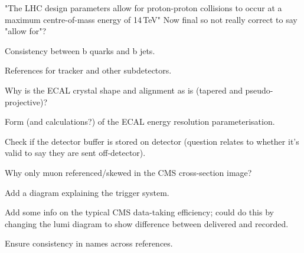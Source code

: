 
"The LHC design parameters allow for proton-proton collisions to occur at a maximum centre-of-mass energy of 14\,TeV"
Now final so not really correct to say "allow for"?

Consistency between b quarks and b jets.

References for tracker and other subdetectors.

Why is the ECAL crystal shape and alignment as is (tapered and pseudo-projective)?

Form (and calculations?) of the ECAL energy resolution parameterisation.

Check if the detector buffer is stored on detector (question relates to whether it's valid to say they are sent off-detector).

Why only muon referenced/skewed in the CMS cross-section image?

Add a diagram explaining the trigger system.

Add some info on the typical CMS data-taking efficiency; could do this by changing the lumi diagram to show difference between delivered and recorded.

Ensure consistency in names across references.
